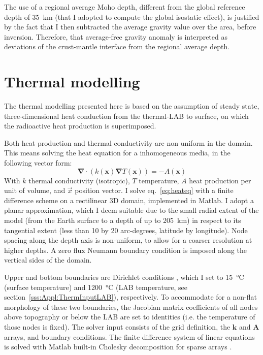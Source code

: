 The use of a regional average Moho depth, different from the global reference depth of \SI{35}{\kilo \metre} (that I adopted to compute the global isostatic effect), is justified by the fact that I then subtracted the average gravity value over the area, before inversion.
Therefore, that average-free gravity anomaly is interpreted as deviations of the crust-mantle interface from the regional average depth.

\section{Thermal modelling}
\label{s:Appl:Therm}
The thermal modelling presented here is based on the assumption of steady state, three-dimensional heat conduction from the thermal-LAB to surface, on which the radioactive heat production is superimposed.

Both heat production and thermal conductivity are non uniform in the domain.
This means solving the heat equation for a inhomogeneous media, in the following vector form:
\begin{equation}
\label{eq:heateq}
\mathbf{\nabla} \cdot ( k(\mathbf{x}) \mathbf{\nabla} T(\mathbf{x}) ) = - A(\mathbf{x})
\end{equation}
With $k$ thermal conductivity (isotropic), $T$ temperature, $A$ heat production per unit of volume, and $\vec{x}$ position vector.
I solve eq.~\ref{eq:heateq} with a finite difference scheme on a rectilinear 3D domain, implemented in Matlab.
I adopt a planar approximation, which I deem suitable due to the small radial extent of the model (from the Earth surface to a depth of up to 205~\si{\kilo \metre}) in respect to its tangential extent (less than 10 by 20 arc-degrees, latitude by longitude).
Node spacing along the depth axis is non-uniform, to allow for a coarser resolution at higher depths.
A zero flux Neumann boundary condition \parencite{smith1985} is imposed along the vertical sides of the domain.

Upper and bottom boundaries are Dirichlet conditions \parencite{smith1985}, which I set to \SI{15}{\celsius} (surface temperature) and \SI{1200}{\celsius} (LAB temperature, see section~\ref{sss:Appl:ThermInputLAB}), respectively.
To accommodate for a non-flat morphology of these two boundaries, the Jacobian matrix coefficients of all nodes above topography or below the LAB are set to identities (i.e. the temperature of those nodes is fixed).
The solver input consists of the grid definition, the $\mathbf{k}$ and $\mathbf{A}$ arrays, and boundary conditions.
The finite difference system of linear equations is solved with Matlab built-in Cholesky decomposition for sparse arrays \parencite{Davis2006}.

